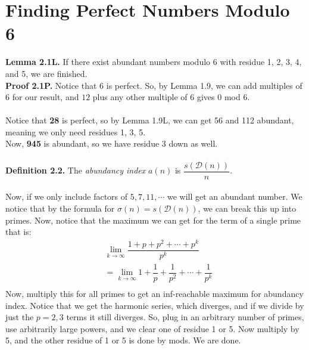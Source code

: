 \documentclass{article}
\begin{document}
\section{Finding Perfect Numbers Modulo 6}
\textbf{Lemma 2.1L.} If there exist abundant numbers modulo 6 with residue 1, 2, 3, 4, and 5, we are finished. \\
\textbf{Proof 2.1P.} Notice that 6 is perfect. So, by Lemma 1.9, we can add multiples of 6 for our result, and $12$ plus any other multiple of $6$ gives $0$ mod 6.
\\~\\
Notice that \textbf{28} is perfect, so by Lemma 1.9L, we can get 56 and 112 abundant, meaning we only need residues 1, 3, 5. \\
Now, \textbf{945} is abundant, so we have residue 3 down as well. \\~\\
\textbf{Definition 2.2.} The \textit{abundancy index} $a(n)$ is $\dfrac{s(\mathcal{D}(n))}{n}$. \\~\\
Now, if we only include factors of $5, 7, 11, \cdots$ we will get an abundant number. We notice that by the formula for $\sigma(n) = s(\mathcal{D}(n))$, we
can break this up into primes. Now, notice that the maximum we can get for the term of a single prime that is:
\begin{align}
&\lim_{k \rightarrow \infty}\dfrac{1 + p + p^2 + \cdots + p^k}{p^k} \\
&= \lim_{k \rightarrow \infty} 1 + \dfrac{1}{p} + \dfrac{1}{p^2} + \cdots + \dfrac{1}{p^k} \\
\end{align}
Now, multiply this for all primes to get an inf-reachable maximum for abundancy index. Notice that we get the harmonic series, which diverges, 
and if we divide by just the $p=2,3$ terms it still diverges. 
So, plug in an arbitrary number of primes, use arbitrarily large powers, and we clear one of residue 1 or 5. Now multiply by 5, and the other residue of 1 or 5
is done by mods. We are done.
\end{document}
